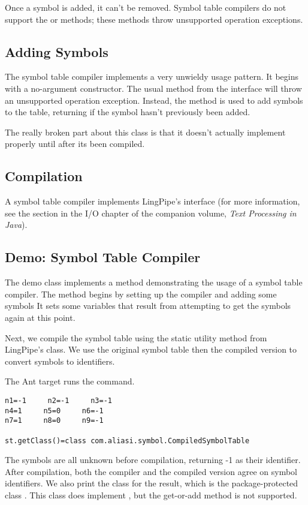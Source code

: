 Once a symbol is added, it can't be removed.  Symbol table
compilers do not support the  or 
methods; these methods throw unsupported operation exceptions.

\subsection{Adding Symbols}

The symbol table compiler implements a very unwieldy usage pattern.
It begins with a no-argument constructor.  The usual
 method from the 
interface will throw an unsupported operation exception.  Instead, the
method  is used to add symbols to the table,
returning  if the symbol hasn't previously been added.

The really broken part about this class is that it doesn't actually
implement  properly until after its been compiled.

\subsection{Compilation}

A symbol table compiler implements LingPipe's 
interface (for more information, see the section in the I/O chapter of
the companion volume, {\it Text Processing in Java}).


\subsection{Demo: Symbol Table Compiler}

The demo class  implements a 
method demonstrating the usage of a symbol table compiler.  The method
begins by setting up the compiler and adding some symbols
%
%
It sets some variables that result from attempting to get the symbols
again at this point.

Next, we compile the symbol table using the static utility method
 from LingPipe's  class.
We use the original symbol table then the compiled version to convert
symbols to identifiers.

The Ant target  runs the command.
%
\begin{verbatim}
n1=-1     n2=-1     n3=-1
n4=1     n5=0     n6=-1
n7=1     n8=0     n9=-1

st.getClass()=class com.aliasi.symbol.CompiledSymbolTable
\end{verbatim}
%
The symbols are all unknown before compilation, returning -1 as their
identifier.  After compilation, both the compiler and the compiled
version agree on symbol identifiers.  We also print the class for the
result, which is the package-protected class
.  This class does implement
, but the get-or-add method is not supported.

